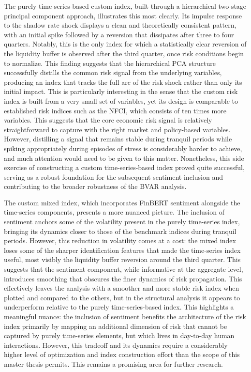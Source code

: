 \documentclass[12pt,a4paper]{report}
\begin{document}
The purely time-series-based custom index, built through a hierarchical two-stage principal component approach, illustrates this most clearly. Its impulse response to the shadow rate shock displays a clean and theoretically consistent pattern, with an initial spike followed by a reversion that dissipates after three to four quarters. Notably, this is the only index for which a statistically clear reversion of the liquidity buffer is observed after the third quarter, once risk conditions begin to normalize. This finding suggests that the hierarchical PCA structure successfully
distills the common risk signal from the underlying variables, producing an index
that tracks the full arc of the risk shock rather than only its initial impact. This is particularly interesting in the sense that the custom risk index is built from a very small set of variables, yet its design is comparable to established risk indices such as the NFCI, which consists of ten times more variables. This suggests that the core economic risk signal is relatively straightforward to capture with the right market and policy-based variables. However, distilling a signal that remains stable during tranquil periods while spiking appropriately during episodes of stress is considerably harder to achieve, and much attention would need to be given to this matter. Nonetheless, this side exercise of constructing a custom time-series-based index proved quite successful, serving as a robust foundation for the subsequent sentiment inclusion and contributing to the broader robustness of the BVAR analysis. 

The custom mixed index, which incorporates FinBERT sentiment alongside the
time-series components, presents a more nuanced picture. The inclusion of sentiment
anchors some of the volatility present in the purely time-series index, bringing
its dynamics closer to those of the benchmark indices during tranquil periods.
However, this reduction in volatility comes at a cost: the mixed index loses some
of the sharper identification features that made the time-series index useful, most
visibly the liquidity buffer reversion around the third quarter. This suggests that
the sentiment component, while informative at the aggregate level, introduces
smoothing that obscures the finer dynamics of risk propagation. This effectively leaves the analysis with a smoother and more stable risk index when plotted and compared to the others, but in the structural analysis it appears to underperform relative to the purely time-series-based index. This highlights a meaningful nuance: the inclusion of sentiment benefits the architecture of the risk index primarily by mapping an additional dimension of risk that cannot be captured by purely time-series elements, but which lives in day-to-day human interactions. However, this tradeoff and its dynamics require a considerably higher level of optimization and index construction effort than the scope of this master thesis permits. This remains a promising area for further research. 
\end{document}
